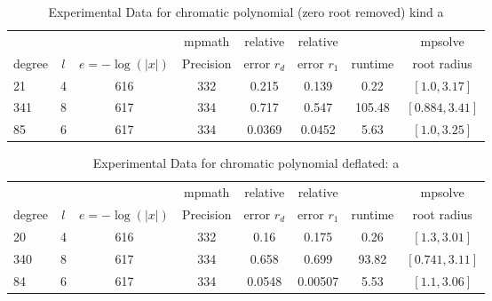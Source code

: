 \documentclass[sigconf]{acmart}
\begin{document}
\begin{table}[t]
\caption{Experimental Data for chromatic polynomial (zero root removed) kind a}
\label{tab:chrma}
\vskip -0.15in
\begin{center}
\begin{small}
\begin{sc}
\begin{tabular}{lccccccc}
\toprule
&  &  & mpmath & relative  & relative &  & mpsolve \\
degree  & $l$& $e=-\log(|x|)$& Precision &error $r_d$       & error $r_1$ &runtime& root radius\\
\midrule
 21 & 4 & 616 & 332 & 0.215 & 0.139 & 0.22 & $[1.0, 3.17]$\\
 341 & 8 & 617 & 334 & 0.717 & 0.547 & 105.48 & $[0.884, 3.41]$\\
 85 & 6 & 617 & 334 & 0.0369 & 0.0452 & 5.63 & $[1.0, 3.25]$\\
\bottomrule
\end{tabular}
\end{sc}
\end{small}
\end{center}
\vskip 0.05in
\end{table}


\begin{table}[t]
\caption{Experimental Data for chromatic polynomial deflated: a}
\label{tab:chrma_d}
\vskip -0.15in
\begin{center}
\begin{small}
\begin{sc}
\begin{tabular}{lccccccc}
\toprule
&  &  & mpmath & relative  & relative &  & mpsolve \\
degree  & $l$& $e=-\log(|x|)$& Precision &error $r_d$       & error $r_1$ &runtime& root radius\\
\midrule
20 & 4 & 616 & 332 & 0.16 & 0.175 & 0.26 & $[1.3, 3.01]$\\
 340 & 8 & 617 & 334 & 0.658 & 0.699 & 93.82 & $[0.741, 3.11]$\\
 84 & 6 & 617 & 334 & 0.0548 & 0.00507 & 5.53 & $[1.1, 3.06]$\\
\bottomrule
\end{tabular}
\end{sc}
\end{small}
\end{center}
\vskip 0.05in
\end{table}
\end{document}
